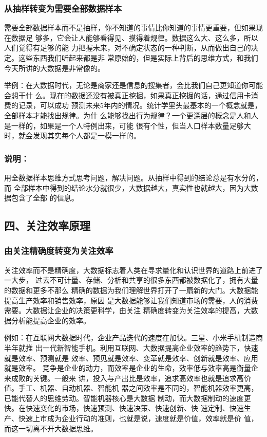 \documentclass[11pt]{ctexart}
\begin{document}
{{{{\subsubsection{从抽样转变为需要全部数据样本}
\label{sec:org8e224f0}

需要全部数据样本而不是抽样，你不知道的事情比你知道的事情更重要，但如果现在数据足
够多，它会让人能够看得见、摸得着规律。数据这么大、这么多，所以人们觉得有足够的能
力把握未来，对不确定状态的一种判断，从而做出自己的决定。这些东西我们听起来都是非
常原始的，但是实际上背后的思维方式，和我们今天所讲的大数据是非常像的。

举例：在大数据时代，无论是商家还是信息的搜集者，会比我们自己更知道你可能会想干什
么。现在的数据还没有被真正挖掘，如果真正挖掘的话，通过信用卡消费的记录，可以成功
预测未来5年内的情况。统计学里头最基本的一个概念就是，全部样本才能找出规律。为什
么能够找出行为规律？一个更深层的概念是人和人是一样的，如果是一个人特例出来，可能
很有个性，但当人口样本数量足够大时，就会发现其实每个人都是一模一样的。

\subsubsection{说明：}
\label{sec:org83f0769}
用全数据样本思维方式思考问题，解决问题。从抽样中得到的结论总是有水分的，而
全部样本中得到的结论水分就很少，大数据越大，真实性也就越大，因为大数据包含了全部
的信息。

\subsection{四、关注效率原理}
\label{sec:orgea8f562}

\subsubsection{由关注精确度转变为关注效率}
\label{sec:orgc37e383}

关注效率而不是精确度，大数据标志着人类在寻求量化和认识世界的道路上前进了一大步，
过去不可计量、存储、分析和共享的很多东西都被数据化了，拥有大量的数据和更多不那么
精确的数据为我们理解世界打开了一扇新的大门。大数据能提高生产效率和销售效率，原因
是大数据能够让我们知道市场的需要，人的消费需要。大数据让企业的决策更科学，由关注
精确度转变为关注效率的提高，大数据分析能提高企业的效率。

例如：在互联网大数据时代，企业产品迭代的速度在加快。三星、小米手机制造商半年就推
出一代新智能手机。利用互联网、大数据提高企业效率的趋势下，快速就是效率、预测就是
效率、预见就是效率、变革就是效率、创新就是效率、应用就是效率。
竞争是企业的动力，而效率是企业的生命，效率低与效率高是衡量企来成败的关键。一般来
讲，投入与产出比是效率，追求高效率也就是追求高价值。手工、机器、自动机器、智能机
器之间效率是不同的，智能机器效率更高，已能代替人的思维劳动。智能机器核心是大数据
制动，而大数据制动的速度更快。在快速变化的市场，快速预测、快速决策、快速创新、快
速定制、快速生产、快速上市成为企业行动的准则，也就是说，速度就是价值，效率就是价
值，而这一切离不开大数据思维。

}}}}
\end{document}
